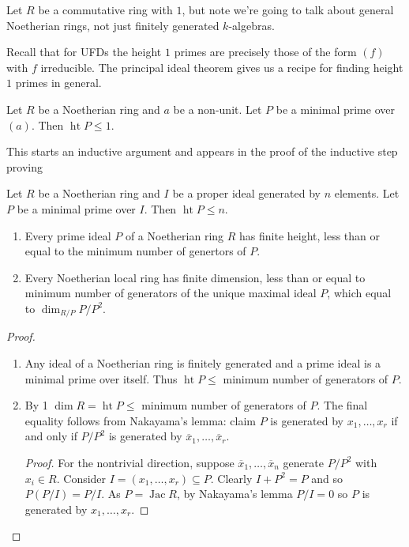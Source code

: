 \documentclass[a4paper]{article}
\DeclareMathOperator{\jac}{Jac} %
\DeclareMathOperator{\htt}{ht} %
\begin{document}
Let \(R\) be a commutative ring with \(1\), but note we're going to talk about general Noetherian rings, not just finitely generated \(k\)-algebras.

Recall that for UFDs the height \(1\) primes are precisely those of the form \((f)\) with \(f\) irreducible. The principal ideal theorem gives us a recipe for finding height \(1\) primes in general.

\begin{theorem}
  \label{thm:principal ideal theorem}
  Let \(R\) be a Noetherian ring and \(a\) be a non-unit. Let \(P\) be a minimal prime over \((a)\). Then \(\htt P \leq 1\).
\end{theorem}

This starts an inductive argument and appears in the proof of the inductive step proving

\begin{theorem}
  \label{thm:generalised principal ideal theorem}
  Let \(R\) be a Noetherian ring and \(I\) be a proper ideal generated by \(n\) elements. Let \(P\) be a minimal prime over \(I\). Then \(\htt P \leq n\).
\end{theorem}

\begin{corollary}\leavevmode
  \begin{enumerate}
  \item Every prime ideal \(P\) of a Noetherian ring \(R\) has finite height, less than or equal to the minimum number of genertors of \(P\).
  \item Every Noetherian local ring has finite dimension, less than or equal to minimum number of generators of the unique maximal ideal \(P\), which equal to \(\dim_{R/P} P/P^2\).
  \end{enumerate}
\end{corollary}

\begin{proof}\leavevmode
  \begin{enumerate}
  \item Any ideal of a Noetherian ring is finitely generated and a prime ideal is a minimal prime over itself. Thus \(\htt P \leq\) minimum number of generators of \(P\).
  \item By 1 \(\dim R = \htt P \leq\) minimum number of generators of \(P\). The final equality follows from Nakayama's lemma: claim \(P\) is generated by \(x_1, \dots, x_r\) if and only if \(P/P^2\) is generated by \(\overline x_1, \dots, \overline x_r\).

    \begin{proof}
      For the nontrivial direction, suppose \(\overline x_1, \dots, \overline x_n\) generate \(P/P^2\) with \(x_i \in R\). Consider \(I = (x_1, \dots, x_r) \subseteq P\). Clearly \(I + P^2 = P\) and so \(P (P/I) = P/I\). As \(P = \jac R\), by Nakayama's lemma \(P/I = 0\) so \(P\) is generated by \(x_1, \dots, x_r\).
    \end{proof}
  \end{enumerate}
\end{proof}
\end{document}
